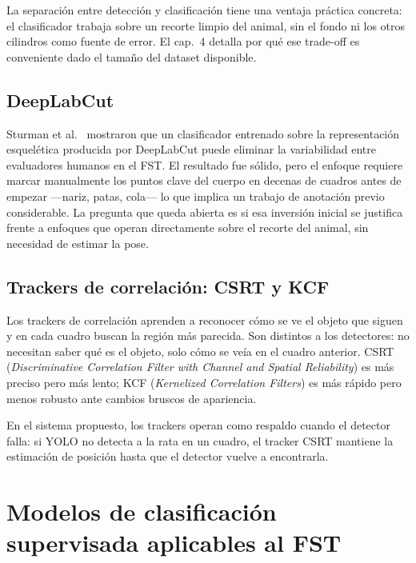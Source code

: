 La separación entre detección y clasificación tiene una ventaja práctica concreta: el
clasificador trabaja sobre un recorte limpio del animal, sin el fondo ni los otros
cilindros como fuente de error. El cap.~4 detalla por qué ese trade-off es conveniente
dado el tamaño del dataset disponible.

\subsection{DeepLabCut}

Sturman et al.\ \cite{sturman2020_dlc} mostraron que un clasificador entrenado sobre
la representación esquelética producida por DeepLabCut \cite{mathis2018_dlc} puede
eliminar la variabilidad entre evaluadores humanos en el FST. El resultado fue
sólido, pero el enfoque requiere marcar manualmente los puntos clave del cuerpo en
decenas de cuadros antes de empezar ---nariz, patas, cola--- lo que implica un trabajo
de anotación previo considerable. La pregunta que queda abierta es si esa inversión
inicial se justifica frente a enfoques que operan directamente sobre el recorte del
animal, sin necesidad de estimar la pose.

\subsection{Trackers de correlación: CSRT y KCF}

Los trackers de correlación aprenden a reconocer cómo se ve el objeto que siguen y en
cada cuadro buscan la región más parecida. Son distintos a los detectores: no necesitan
saber qué es el objeto, solo cómo se veía en el cuadro anterior. CSRT
(\textit{Discriminative Correlation Filter with Channel and Spatial Reliability})
\cite{lukezic2017} es más preciso pero más lento; KCF (\textit{Kernelized Correlation
Filters}) \cite{henriques2015} es más rápido pero menos robusto ante cambios bruscos de
apariencia.

En el sistema propuesto, los trackers operan como respaldo cuando el detector falla: si
YOLO no detecta a la rata en un cuadro, el tracker CSRT mantiene la estimación de
posición hasta que el detector vuelve a encontrarla.

\section{Modelos de clasificación supervisada aplicables al FST}

